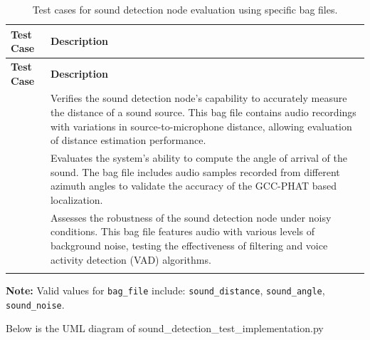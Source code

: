 \documentclass{CSSRforAfrica}
\begin{document}
\begin{longtable}{| l | p{13cm} |}
	\hline
	\rowcolor{blue!20}
	\textbf{Test Case} & \textbf{Description} \\
	\hline
	\endfirsthead
	
	\hline
	\rowcolor{blue!20}
	\textbf{Test Case} & \textbf{Description} \\
	\hline
	\endhead
	
	\text{Sound Distance} & Verifies the sound detection node's capability to accurately measure the distance of a sound source. This bag file contains audio recordings with variations in source-to-microphone distance, allowing evaluation of distance estimation performance. \\
	\hline
	\text{Sound Angle} & Evaluates the system's ability to compute the angle of arrival of the sound. The bag file includes audio samples recorded from different azimuth angles to validate the accuracy of the GCC-PHAT based localization. \\
	\hline
	\text{Sound Noise} & Assesses the robustness of the sound detection node under noisy conditions. This bag file features audio with various levels of background noise, testing the effectiveness of filtering and voice activity detection (VAD) algorithms. \\
	\hline
	\caption{Test cases for sound detection node evaluation using specific bag files.}
	\label{tab:sound_detection_tests}
\end{longtable}


\noindent \textbf{Note:} Valid values for \texttt{bag\_file} include: \texttt{sound\_distance}, \texttt{sound\_angle}, \texttt{sound\_noise}.

\newpage

Below is the UML diagram of sound\_detection\_test\_implementation.py
\end{document}
